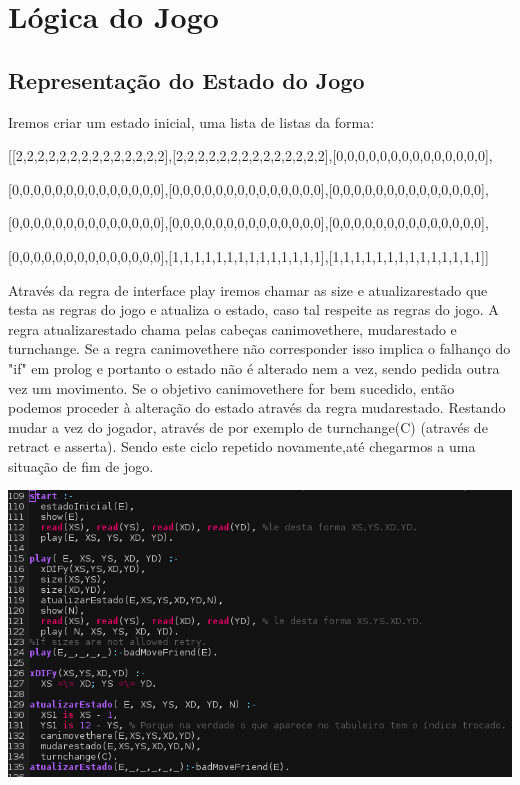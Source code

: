 \documentclass[a4paper]{article}
\begin{document}
\section{Lógica do Jogo}
\subsection{Representação do Estado do Jogo}
\begin{center}
Iremos criar um estado inicial, uma lista de listas da forma:

[[2,2,2,2,2,2,2,2,2,2,2,2,2,2],[2,2,2,2,2,2,2,2,2,2,2,2,2,2],[0,0,0,0,0,0,0,0,0,0,0,0,0,0],

  [0,0,0,0,0,0,0,0,0,0,0,0,0,0],[0,0,0,0,0,0,0,0,0,0,0,0,0,0],[0,0,0,0,0,0,0,0,0,0,0,0,0,0],

  [0,0,0,0,0,0,0,0,0,0,0,0,0,0],[0,0,0,0,0,0,0,0,0,0,0,0,0,0],[0,0,0,0,0,0,0,0,0,0,0,0,0,0],

[0,0,0,0,0,0,0,0,0,0,0,0,0,0],[1,1,1,1,1,1,1,1,1,1,1,1,1,1],[1,1,1,1,1,1,1,1,1,1,1,1,1,1]]
\end{center}
Através da regra de interface play iremos chamar as size e atualizarestado que testa as regras do jogo e atualiza o estado, caso tal respeite as regras do jogo. A regra atualizarestado chama pelas cabeças canimovethere, mudarestado e turnchange. Se a regra canimovethere não corresponder isso implica o falhanço do "if" em prolog e portanto o estado não é alterado nem a vez, sendo pedida outra vez um movimento. Se o objetivo canimovethere for bem sucedido, então podemos proceder à alteração do estado através da regra mudarestado. Restando mudar a vez do jogador, através de por exemplo de turnchange(C) (através de retract e asserta). Sendo este ciclo repetido novamente,até chegarmos a uma situação de fim de jogo.
\begin{center}
  \includegraphics[scale=0.60]{representacao.png}
\end{center}
\end{document}
